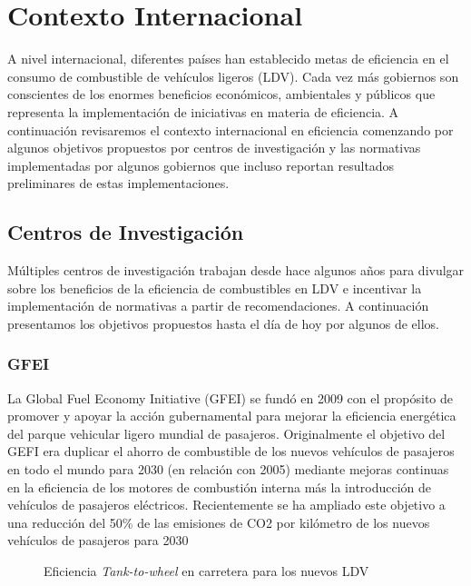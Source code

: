 
\chapter{Contexto Internacional}

A nivel internacional, diferentes países han establecido metas de eficiencia en el consumo de combustible de vehículos ligeros (LDV). Cada vez más gobiernos son conscientes de los enormes beneficios económicos, ambientales y públicos que representa la implementación de iniciativas en materia de eficiencia. A continuación revisaremos el contexto internacional en eficiencia comenzando por algunos objetivos propuestos por centros de investigación y las normativas implementadas por algunos gobiernos que incluso reportan resultados preliminares de estas implementaciones. 

\section{Centros de Investigación}

Múltiples centros de investigación trabajan desde hace algunos años para divulgar sobre los beneficios de la eficiencia de combustibles en LDV e incentivar la implementación de normativas a partir de recomendaciones. A continuación presentamos los objetivos propuestos hasta el día de hoy por algunos de ellos. 

\subsection{GFEI}

La Global Fuel Economy Initiative (GFEI) se fundó en 2009 con el propósito de promover y apoyar la acción gubernamental para mejorar la eficiencia energética del parque vehicular ligero mundial de pasajeros. Originalmente el objetivo del GEFI era duplicar el ahorro de combustible de los nuevos vehículos de pasajeros en todo el mundo para 2030 (en relación con 2005) mediante mejoras continuas en la eficiencia de los motores de combustión interna más la introducción de vehículos de pasajeros eléctricos. Recientemente se ha ampliado este objetivo a una reducción del 50\% de las emisiones de CO2 por kilómetro de los nuevos vehículos de pasajeros para 2030 \cite{Prospects_GFEI}

 \begin{figure}[htbp]
   \centering
   
    \caption{Eficiencia \textit{Tank-to-wheel} en carretera para los nuevos LDV \cite{Prospects_GFEI}}
    \label{fig:prospects-GFEI}
\end{figure}

